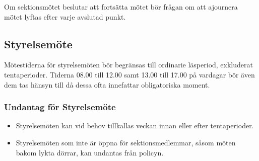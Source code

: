 \documentclass[]{dsekprotokoll}
\begin{document}
Om sektionsmötet beslutar att fortsätta mötet bör frågan om att ajournera mötet lyftas
efter varje avslutad punkt.

\subsection{Styrelsemöte}
Mötestiderna för styrelsemöten bör begränsas till ordinarie läsperiod, exkluderat tentaperioder. Tiderna 08.00 till 12.00 samt 13.00 till 17.00 på vardagar bör även dem tas hänsyn till då dessa ofta innefattar obligatoriska moment.

\subsubsection{Undantag för Styrelsemöte}
\begin{itemize}
    \item Styrelsemöten kan vid behov tillkallas veckan innan eller efter tentaperioder.
    \item Styrelsemöten som inte är öppna för sektionsmedlemmar, såsom möten bakom lykta dörrar, kan undantas från policyn.
\end{itemize}
\end{document}
